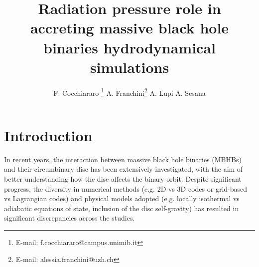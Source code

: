 \documentclass{aa}
\begin{document}
 


   \title{Radiation pressure role in accreting massive black hole binaries hydrodynamical simulations}


   \author{F. Cocchiararo
          \fnmsep\thanks{E-mail: f.cocchiararo@campus.unimib.it} 
          A. Franchini\fnmsep\thanks{E-mail: alessia.franchini@uzh.ch}
          A. Lupi 
          A. Sesana 
          }


   \date{}

 
\abstract
{}

   
\titlerunning{}
   \maketitle
%
\section{Introduction}
In recent years, the interaction between massive black hole binaries (MBHBs) and their circumbinary disc has been extensively investigated, with the aim of better understanding how the disc affects the binary orbit.%
Despite significant progress, the diversity in numerical methods (e.g. 2D vs 3D codes or grid-based vs Lagrangian codes) and physical models adopted (e.g. locally isothermal vs adiabatic equations of state, inclusion of the disc self-gravity) has resulted in significant discrepancies across the studies. 
\end{document}
